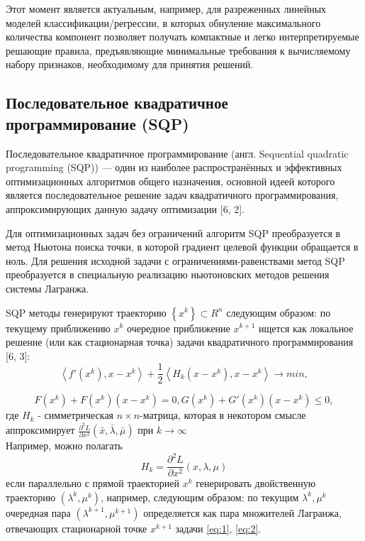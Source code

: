 \documentclass[12pt,a4paper]{article}
\begin{document}
Этот момент является актуальным, например, для разреженных линейных моделей классификации/регрессии, в которых обнуление максимального количества компонент позволяет получать компактные и легко интерпретируемые решающие правила, предъявляющие минимальные требования к вычисляемому набору признаков, необходимому для принятия решений.

\subsection{Последовательное квадратичное программирование (SQP)}	
Последовательное квадратичное программирование (англ. Sequential quadratic\\programming (SQP)) — один из наиболее распространённых и эффективных оптимизационных алгоритмов общего назначения, основной идеей которого является последовательное решение задач квадратичного программирования, аппроксимирующих данную задачу оптимизации [6, 2].
	
Для оптимизационных задач без ограничений алгоритм SQP преобразуется в метод Ньютона поиска точки, в которой градиент целевой функции обращается в ноль. Для решения исходной задачи с ограничениями-равенствами метод SQP преобразуется в специальную реализацию ньютоновских методов решения системы Лагранжа.
	
SQP методы генерируют траекторию $\left\lbrace x^k \right\rbrace \subset R^n$ следующим образом: по текущему приближению $x^k$  очередное приближение $x^{k+1}$ ищется как локальное решение (или как стационарная точка) задачи квадратичного программирования [6, 3]:
	\begin{equation}\label{eq:1}
		\left\langle f'(x^k), x-x^k \right\rangle  + \frac{1}{2}\left\langle H_k(x-x^k), x-x^k \right\rangle \longrightarrow min,
	\end{equation}

	\begin{equation}\label{eq:2}
		F(x^k)+F(x^k)(x-x^k)=0, G(x^k)+G'(x^k)(x-x^k) \leq 0,
	\end{equation}
где $H_k$ - симметрическая $n \times n$-матрица, которая в некотором смысле аппроксимирует $\frac{\partial^2 L}{\partial x^2}(\bar{x}, \bar{\lambda}, \bar{\mu})$ при $k\longrightarrow\infty$\\ Например, можно полагать
	\begin{equation}
	H_k = \frac{\partial^2 L}{\partial x^2}(x, \lambda, \mu)
	\end{equation}
если параллельно с прямой траекторией ${x^k}$ генерировать двойственную траекторию ${(\lambda^k, \mu^k)}$,
	например, следующим образом: по текущим $\lambda^k, \mu^k$ очередная пара $(\lambda^{k+1}, \mu^{k+1})$ определяется как пара множителей Лагранжа, отвечающих стационарной точке $x^{k+1}$ задачи \ref{eq:1}, \ref{eq:2}. 
\end{document}

